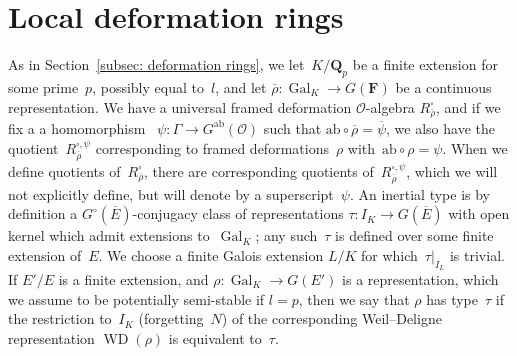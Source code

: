 \documentclass{amsart}
\renewcommand{\mathbb}{\mathbf}
\newcommand{\psibar}{\overline{\psi}}
\newcommand\Gab{G^{\mathrm{ab}}}
\theoremstyle{definition}
\theoremstyle{remark}
\newcommand{\mar}[1]{}
\newcommand{\mar}[1]{\marginpar{\raggedright\tiny squirrel #1}}
\newcommand{\F}{\FF}
\newcommand{\Q}{\QQ}
\newcommand{\FF}{{\mathbb F}}
\newcommand{\QQ}{{\mathbb Q}}
\newcommand{\cO}{{\mathcal O}}
\DeclareMathOperator{\Gal}{Gal}
\DeclareMathOperator{\Spec}{Spec}
\DeclareMathOperator{\WD}{WD}
\newcommand{\ab}{\mathrm{ab}}
\newcommand{\rhobar}{\overline{\rho}}
\begin{document}
\section{Local deformation rings}\label{sec: local deformation
  rings}As in Section~\ref{subsec: deformation
  rings}, we let~$K/\Q_p$ be a finite extension for some
prime~$p$, possibly equal to~$l$, and let $\rhobar:\Gal_K\to G(\F)$ be a
continuous representation.  We have a universal framed deformation $\cO$-algebra
$R_{\rhobar}^\square$, and if we fix a  a homomorphism ~$\psi:\Gamma\to\Gab(\cO)$
such that $\ab\circ\rhobar=\psibar$, we also have the
quotient~$R_{\rhobar}^{\square,\psi}$ 
corresponding to framed deformations~$\rho$
with~$\ab\circ\rho=\psi$. When we define quotients
of~$R_{\rhobar}^\square$, there are corresponding quotients
of~$R_{\rhobar}^{\square,\psi}$, which we will not explicitly define,
but will denote by a superscript~$\psi$.   %
An inertial type is by definition a $G^\circ(\overline{E})$-conjugacy
class of representations $\tau:I_K\to G(\overline{E})$ with open
kernel which admit extensions to~$\Gal_K$; any such~$\tau$ is defined
over some finite extension of~$E$. We choose a finite Galois extension
$L/K$ for which~$\tau|_{I_L}$ is trivial.  If $E'/E$ is a finite
extension, and $\rho:\Gal_K\to G(E')$ is a representation, which we
assume to be potentially semi-stable if
$l=p$, %
then we say that
$\rho$ has type~$\tau$ if the restriction to~$I_K$ (forgetting~$N$) of
the corresponding Weil--Deligne representation $\WD(\rho)$ is
equivalent to~$\tau$. %
\end{document}
